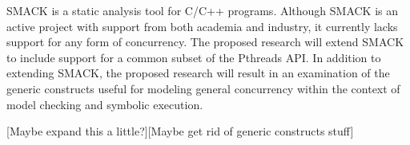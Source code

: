 SMACK is a static analysis tool for C/C++ programs.  Although SMACK is
an active project with support from both academia and industry, it
currently lacks support for any form of concurrency.  The proposed
research will extend SMACK to include support for a common subset of
the Pthreads API.  In addition to extending SMACK, the proposed
research will result in an examination of the generic constructs
useful for modeling general concurrency within the context of model
checking and symbolic execution. 

[Maybe expand this a little?][Maybe get rid of generic constructs stuff]

